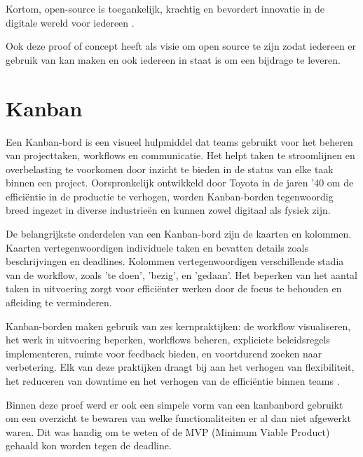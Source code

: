 Kortom, open-source is toegankelijk, krachtig en bevordert innovatie in de digitale wereld voor iedereen \autocite{OpenSource2006}.

Ook deze proof of concept heeft als visie om open source te zijn zodat iedereen er gebruik van kan maken en ook iedereen in staat is om een bijdrage te leveren.

\section{Kanban}
Een Kanban-bord is een visueel hulpmiddel dat teams gebruikt voor het beheren van projecttaken, workflows en communicatie. Het helpt taken te stroomlijnen en overbelasting te voorkomen door inzicht te bieden in de status van elke taak binnen een project. Oorspronkelijk ontwikkeld door Toyota in de jaren '40 om de efficiëntie in de productie te verhogen, worden Kanban-borden tegenwoordig breed ingezet in diverse industrieën en kunnen zowel digitaal als fysiek zijn.

De belangrijkste onderdelen van een Kanban-bord zijn de kaarten en kolommen. Kaarten vertegenwoordigen individuele taken en bevatten details zoals beschrijvingen en deadlines. Kolommen vertegenwoordigen verschillende stadia van de workflow, zoals 'te doen', 'bezig', en 'gedaan'. Het beperken van het aantal taken in uitvoering zorgt voor efficiënter werken door de focus te behouden en afleiding te verminderen.

Kanban-borden maken gebruik van zes kernpraktijken: de workflow visualiseren, het werk in uitvoering beperken, workflows beheren, expliciete beleidsregels implementeren, ruimte voor feedback bieden, en voortdurend zoeken naar verbetering. Elk van deze praktijken draagt bij aan het verhogen van flexibiliteit, het reduceren van downtime en het verhogen van de efficiëntie binnen teams \autocite{Hennigan2024}.

Binnen deze proef werd er ook een simpele vorm van een kanbanbord gebruikt om een overzicht te bewaren van welke functionaliteiten er al dan niet afgewerkt waren. Dit was handig om te weten of de MVP (Minimum Viable Product) gehaald kon worden tegen de deadline.